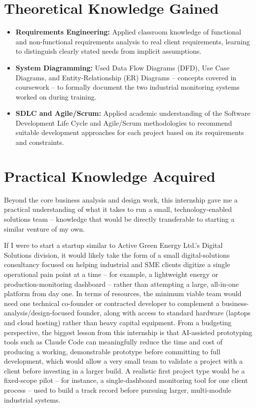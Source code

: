 \section{Theoretical Knowledge Gained}
\begin{itemize}
    \item \textbf{Requirements Engineering:} Applied classroom knowledge of functional and non-functional requirements analysis to real client requirements, learning to distinguish clearly stated needs from implicit assumptions.
    \item \textbf{System Diagramming:} Used Data Flow Diagrams (DFD), Use Case Diagrams, and Entity-Relationship (ER) Diagrams -- concepts covered in coursework -- to formally document the two industrial monitoring systems worked on during training.
    \item \textbf{SDLC and Agile/Scrum:} Applied academic understanding of the Software Development Life Cycle and Agile/Scrum methodologies to recommend suitable development approaches for each project based on its requirements and constraints.
\end{itemize}

\section{Practical Knowledge Acquired}

\par Beyond the core business analysis and design work, this internship gave me a practical understanding of what it takes to run a small, technology-enabled solutions team -- knowledge that would be directly transferable to starting a similar venture of my own.

\par If I were to start a startup similar to Active Green Energy Ltd.'s Digital Solutions division, it would likely take the form of a small digital-solutions consultancy focused on helping industrial and SME clients digitize a single operational pain point at a time -- for example, a lightweight energy or production-monitoring dashboard -- rather than attempting a large, all-in-one platform from day one. In terms of resources, the minimum viable team would need one technical co-founder or contracted developer to complement a business-analysis/design-focused founder, along with access to standard hardware (laptops and cloud hosting) rather than heavy capital equipment. From a budgeting perspective, the biggest lesson from this internship is that AI-assisted prototyping tools such as Claude Code can meaningfully reduce the time and cost of producing a working, demonstrable prototype before committing to full development, which would allow a very small team to validate a project with a client before investing in a larger build. A realistic first project type would be a fixed-scope pilot -- for instance, a single-dashboard monitoring tool for one client process -- used to build a track record before pursuing larger, multi-module industrial systems.

